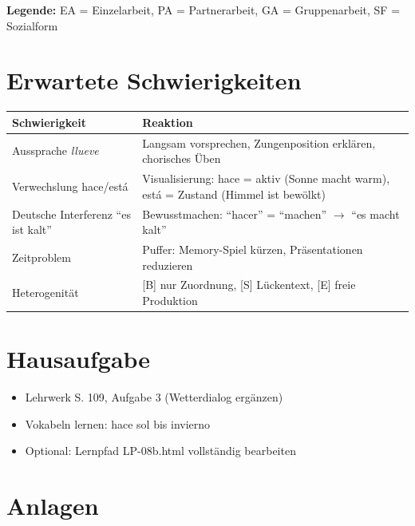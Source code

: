 \documentclass[11pt,a4paper]{article}
\begin{document}
\textbf{Legende:} EA = Einzelarbeit, PA = Partnerarbeit, GA = Gruppenarbeit, SF = Sozialform

\section{Erwartete Schwierigkeiten}

\begin{tabular}{|p{5cm}|p{8cm}|}
\hline
\textbf{Schwierigkeit} & \textbf{Reaktion} \\
\hline
Aussprache \textit{llueve} & Langsam vorsprechen, Zungenposition erklären, chorisches Üben \\
\hline
Verwechslung hace/está & Visualisierung: hace = aktiv (Sonne macht warm), está = Zustand (Himmel ist bewölkt) \\
\hline
Deutsche Interferenz ``es ist kalt'' & Bewusstmachen: ``hacer'' = ``machen'' $\rightarrow$ ``es macht kalt'' \\
\hline
Zeitproblem & Puffer: Memory-Spiel kürzen, Präsentationen reduzieren \\
\hline
Heterogenität & [B] nur Zuordnung, [S] Lückentext, [E] freie Produktion \\
\hline
\end{tabular}

\section{Hausaufgabe}

\begin{itemize}
    \item Lehrwerk S. 109, Aufgabe 3 (Wetterdialog ergänzen)
    \item Vokabeln lernen: hace sol bis invierno
    \item Optional: Lernpfad LP-08b.html vollständig bearbeiten
\end{itemize}

\section{Anlagen}
\end{document}
